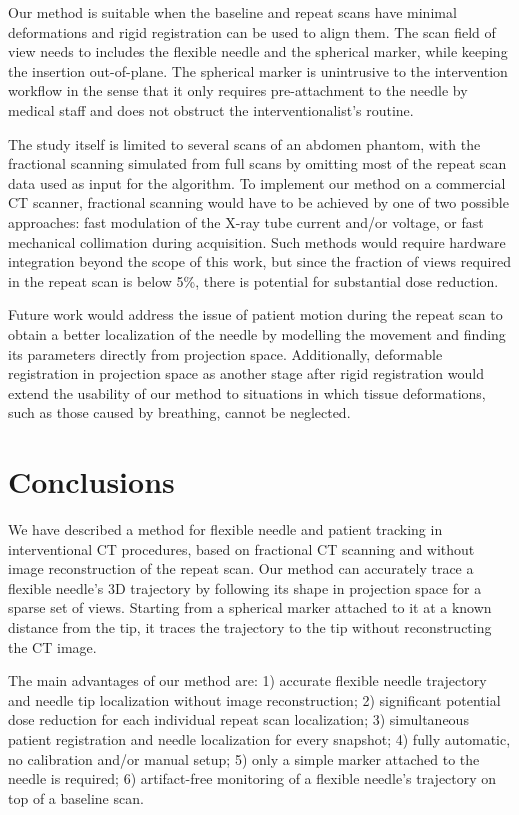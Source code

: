 Our method is suitable when the baseline and repeat scans have minimal deformations and rigid registration can be used to align them. The scan field of view needs to includes the flexible needle and the spherical marker, while keeping the insertion out-of-plane. The spherical marker is unintrusive to the intervention workflow in the sense that it only requires pre-attachment to the needle by medical staff and does not obstruct the interventionalist's routine.

The study itself is limited to several scans of an abdomen phantom, with the fractional scanning simulated from full scans by omitting most of the repeat scan data used as input for the algorithm. To implement our method on a commercial CT scanner, fractional scanning would have to be achieved by one of two possible approaches: fast modulation of the X-ray tube current and/or voltage, or fast mechanical collimation during acquisition. Such methods would require hardware integration beyond the scope of this work, but since the fraction of views required in the repeat scan is below 5\%, there is potential for substantial dose reduction.

Future work would address the issue of patient motion during the repeat scan to obtain a better localization of the needle by modelling the movement and finding its parameters directly from projection space. Additionally, deformable registration in projection space as another stage after rigid registration would extend the usability of our method to situations in which tissue deformations, such as those caused by breathing, cannot be neglected.

\section{Conclusions}
We have described a method for flexible needle and patient tracking in interventional CT procedures, based on fractional CT scanning and without image reconstruction of the repeat scan.
Our method can accurately trace a flexible needle's 3D trajectory by following its shape in projection space for a sparse set of views. Starting from a spherical marker attached to it at a known distance from the tip, it traces the trajectory to the tip without reconstructing the CT image.

The main advantages of our method are:
1) accurate flexible needle trajectory and needle tip localization without image reconstruction;
2) significant potential dose reduction for each individual repeat scan localization;
3) simultaneous patient registration and needle localization for every snapshot; 
4) fully automatic, no calibration and/or manual setup;
5) only a simple marker attached to the needle is required; 
6) artifact-free monitoring of a flexible needle's trajectory on top of a baseline scan.

